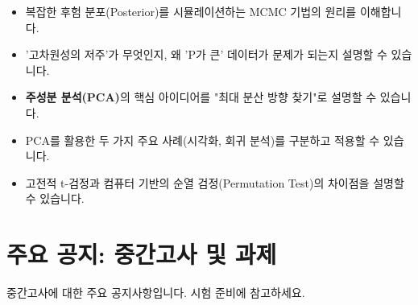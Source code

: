 \documentclass[11pt,a4paper]{book}
\theoremstyle{definition}
\begin{document}
\begin{keyconcept}[title={이번 주 학습 목표}]
\begin{itemize}
    \item 복잡한 후험 분포(Posterior)를 시뮬레이션하는 MCMC 기법의 원리를 이해합니다.
    \item '고차원성의 저주'가 무엇인지, 왜 'P가 큰' 데이터가 문제가 되는지 설명할 수 있습니다.
    \item \textbf{주성분 분석(PCA)}의 핵심 아이디어를 "최대 분산 방향 찾기"로 설명할 수 있습니다.
    \item PCA를 활용한 두 가지 주요 사례(시각화, 회귀 분석)를 구분하고 적용할 수 있습니다.
    \item 고전적 t-검정과 컴퓨터 기반의 순열 검정(Permutation Test)의 차이점을 설명할 수 있습니다.
\end{itemize}
\end{keyconcept}


\section{주요 공지: 중간고사 및 과제}
중간고사에 대한 주요 공지사항입니다. 시험 준비에 참고하세요.
\end{document}
